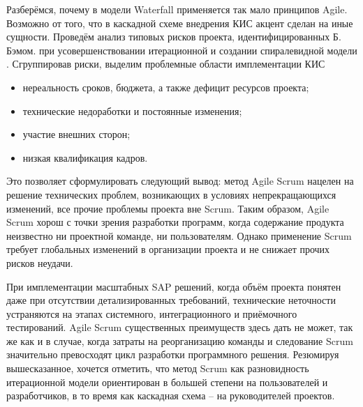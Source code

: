 \documentclass[12pt]{article}
\begin{document}
Разберёмся, почему в модели Waterfall применяется так мало принципов Agile.
Возможно от того, что в каскадной схеме внедрения КИС акцент сделан на иные
сущности. Проведём анализ типовых рисков проекта, идентифицированных Б. Бэмом.
при усовершенствовании итерационной и создании спиралевидной модели \cite{InfoSysImplementation}.
Сгруппировав риски, выделим проблемные области имплементации КИС

\begin{itemize}
  \item нереальность сроков, бюджета, а также дефицит ресурсов проекта;
  \item технические недоработки и постоянные изменения;
  \item участие внешних сторон;
  \item низкая квалификация кадров.
\end{itemize}

Это позволяет сформулировать следующий вывод: метод Agile Scrum нацелен на
решение технических проблем, возникающих в условиях непрекращающихся
изменений, все прочие проблемы проекта вне Scrum. Таким образом, Agile Scrum
хорош с точки зрения разработки программ, когда содержание продукта неизвестно ни
проектной команде, ни пользователям. Однако применение Scrum требует глобальных
изменений в организации проекта и не снижает прочих рисков неудачи.

При имплементации масштабных SAP решений, когда объём проекта понятен
даже при отсутствии детализированных требований, технические неточности
устраняются на этапах системного, интеграционного и приёмочного тестирований.
Agile Scrum существенных преимуществ здесь дать не может, так же как и в случае,
когда затраты на реорганизацию команды и следование Scrum значительно
превосходят цикл разработки программного решения. Резюмируя вышесказанное,
хочется отметить, что метод Scrum как разновидность итерационной модели
ориентирован в большей степени на пользователей и разработчиков, в то время как
каскадная схема – на руководителей проектов.


\end{document}
